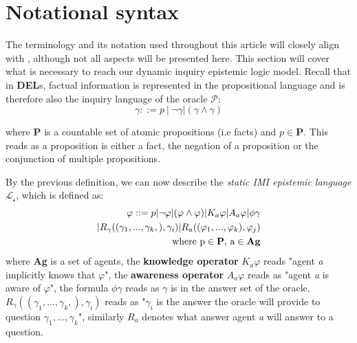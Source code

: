 \section{Notational syntax}
The terminology and its notation used throughout this article will closely
align with \cite{delimi}, although not all aspects will be presented here. This
section will cover what is necessary to reach our dynamic inquiry epistemic
logic model. Recall that in \textbf{DEL}s, factual information is represented
in the propositional language and is therefore also the inquiry language of the
oracle $\mathscr{P}$: $$ \gamma::= p\:|\:\neg\gamma|(\gamma\land\gamma) $$

where \textbf{P} is a countable set of atomic propositions (i.e facts) and $p
	\in \mathbf{P}$. This reads as a proposition is either a fact, the negation of
a proposition or the conjunction of multiple propositions.

By the previous definition, we can now describe the \textit{static IMI
	epistemic language} $\mathscr{L_s}$, which is defined as:
\begin{align*}
	\varphi ::= p |\neg\varphi|(\varphi \land \varphi) | K_a\varphi | A_a\varphi | \phi\gamma \\| R_\gamma((\gamma_1,...,\gamma_k,), \gamma_i) | R_a((\varphi_1,...,\varphi_k), \varphi_j) \\ \text{where p} \in \text{\textbf{P}}\text{, a} \in \text{\textbf{Ag}}
\end{align*}
where \textbf{Ag} is a set of agents, the \textbf{knowledge operator} $K_a\varphi$ reads "agent \textit{a} implicitly knows that $\varphi$", the \textbf{awareness operator} $A_a\varphi$ reads as "agent \textit{a} is aware of $\varphi$", the formula $\phi\gamma$ reads as $\gamma$ is in the answer set of the oracle. $R_\gamma((\gamma_1,...,\gamma_k,), \gamma_i)$ reads as "$\gamma_i$ is the answer the oracle will provide to question $\gamma_1,...,\gamma_k$", similarly $R_a$ denotes what answer agent \textit{a} will answer to a question.

